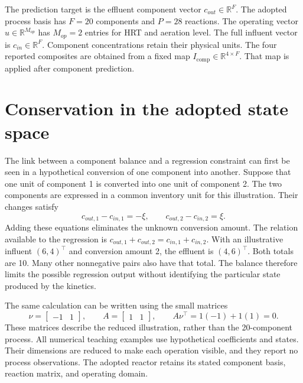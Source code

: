 The prediction target is the effluent component vector \(c_{out}\in\mathbb{R}^{F}\). The adopted process basis has \(F=20\) components and \(P=28\) reactions. The operating vector \(u\in\mathbb{R}^{M_{op}}\) has \(M_{op}=2\) entries for HRT and aeration level. The full influent vector is \(c_{in}\in\mathbb{R}^{F}\). Component concentrations retain their physical units. The four reported composites are obtained from a fixed map \(I_{\mathrm{comp}}\in\mathbb{R}^{4\times F}\). That map is applied after component prediction.

\section{Conservation in the adopted state space}

The link between a component balance and a regression constraint can first be seen in a hypothetical conversion of one component into another. Suppose that one unit of component 1 is converted into one unit of component 2. The two components are expressed in a common inventory unit for this illustration. Their changes satisfy
\begin{equation}
\label{eq:icsor_scalar_inventory_example}
c_{out,1}-c_{in,1}=-\xi,
\qquad
c_{out,2}-c_{in,2}=\xi.
\end{equation}
Adding these equations eliminates the unknown conversion amount. The relation available to the regression is \(c_{out,1}+c_{out,2}=c_{in,1}+c_{in,2}\). With an illustrative influent \((6,4)^\top\) and conversion amount 2, the effluent is \((4,6)^\top\). Both totals are 10. Many other nonnegative pairs also have that total. The balance therefore limits the possible regression output without identifying the particular state produced by the kinetics.

The same calculation can be written using the small matrices
\begin{equation}
\label{eq:icsor_small_inventory_matrices}
\nu=\begin{bmatrix}-1&1\end{bmatrix},
\qquad
A=\begin{bmatrix}1&1\end{bmatrix},
\qquad
A\nu^\top=1(-1)+1(1)=0.
\end{equation}
These matrices describe the reduced illustration, rather than the 20-component process. All numerical teaching examples use hypothetical coefficients and states. Their dimensions are reduced to make each operation visible, and they report no process observations. The adopted reactor retains its stated component basis, reaction matrix, and operating domain.

